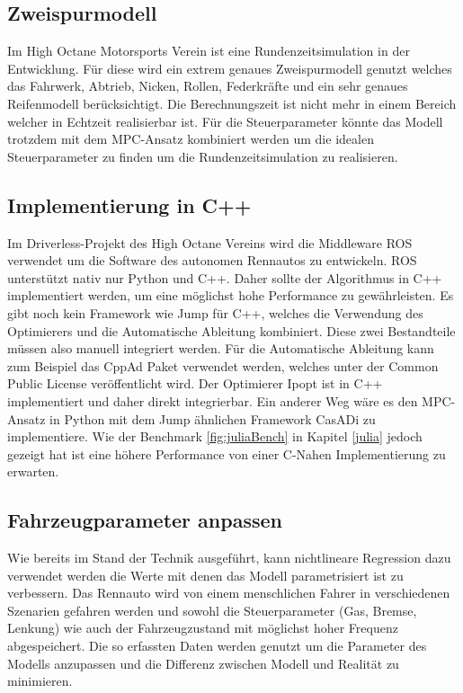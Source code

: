 \documentclass{like}
\begin{document}
\subsection{Zweispurmodell}
Im High Octane Motorsports Verein ist eine Rundenzeitsimulation in der Entwicklung. Für diese wird ein extrem genaues Zweispurmodell genutzt welches das Fahrwerk, Abtrieb, Nicken, Rollen, Federkräfte und ein sehr genaues Reifenmodell berücksichtigt. Die Berechnungszeit ist nicht mehr in einem Bereich welcher in Echtzeit realisierbar ist. Für die Steuerparameter könnte das Modell trotzdem mit dem \ac{MPC}-Ansatz kombiniert werden um die idealen Steuerparameter zu finden um die Rundenzeitsimulation zu realisieren. 

\subsection{Implementierung in C++}
Im Driverless-Projekt des High Octane Vereins wird die Middleware \ac{ROS} verwendet um die Software des autonomen Rennautos zu entwickeln. \ac{ROS} unterstützt nativ nur Python und C++. Daher sollte der Algorithmus in C++ implementiert werden, um eine möglichst hohe Performance zu gewährleisten. 
Es gibt noch kein Framework wie Jump für C++, welches die Verwendung des Optimierers und die Automatische Ableitung kombiniert. Diese zwei Bestandteile müssen also manuell integriert werden. Für die Automatische Ableitung kann zum Beispiel das CppAd Paket verwendet werden, welches unter der Common Public License veröffentlicht wird. Der Optimierer Ipopt ist in C++ implementiert und daher direkt integrierbar. 
Ein anderer Weg wäre es den \ac{MPC}-Ansatz in Python mit dem Jump ähnlichen Framework CasADi zu implementiere. Wie der Benchmark \ref{fig:juliaBench} in Kapitel \ref{julia} jedoch gezeigt hat ist eine höhere Performance von einer C-Nahen Implementierung zu erwarten. 

\subsection{Fahrzeugparameter anpassen}
Wie bereits im Stand der Technik ausgeführt, kann nichtlineare Regression dazu verwendet werden die Werte mit denen das Modell parametrisiert ist zu verbessern. Das Rennauto wird von einem menschlichen Fahrer in verschiedenen Szenarien gefahren werden und sowohl die Steuerparameter (Gas, Bremse, Lenkung) wie auch der Fahrzeugzustand mit möglichst hoher Frequenz abgespeichert. Die so erfassten Daten werden genutzt um die Parameter des Modells anzupassen und die Differenz zwischen Modell und Realität zu minimieren. 


\appendix





%



%


\end{document}
